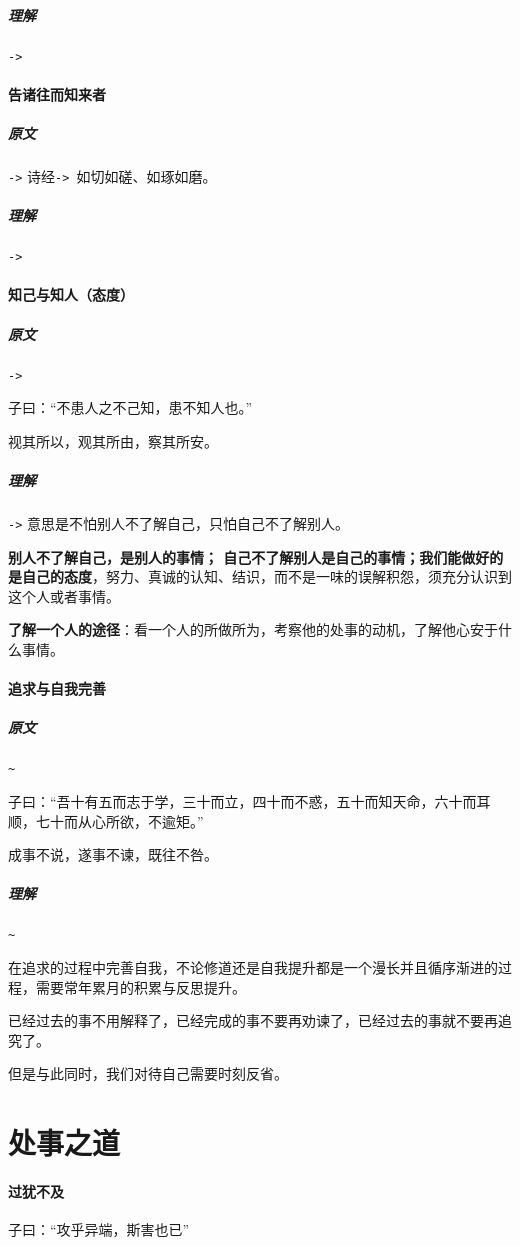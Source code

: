 \documentclass[UTF8,a4paper,8pt]{ctexbook}
\begin{document}
			\subparagraph{理解}\verb|->|
		
		\paragraph{告诸往而知来者}
			\subparagraph{原文}\verb|->|
				诗经\verb|-> |如切如磋、如琢如磨。
			
			\subparagraph{理解}\verb|->|
			
		\paragraph{知己与知人（态度）}
			\subparagraph{原文}\verb|->|
			
				子曰：“不患人之不己知，患不知人也。”
			
				视其所以，观其所由，察其所安。
			
			\subparagraph{理解}\verb|->|
				意思是不怕别人不了解自己，只怕自己不了解别人。
	
				\textbf{别人不了解自己，是别人的事情； 自己不了解别人是自己的事情；我们能做好的是自己的态度}，努力、真诚的认知、结识，而不是一味的误解积怨，须充分认识到这个人或者事情。
		
				\textbf{了解一个人的途径}：看一个人的所做所为，考察他的处事的动机，了解他心安于什么事情。
				
		\paragraph{追求与自我完善}
			\subparagraph{原文}\verb|~|
			
				子曰：“吾十有五而志于学，三十而立，四十而不惑，五十而知天命，六十而耳顺，七十而从心所欲，不逾矩。”
				
				成事不说，遂事不谏，既往不咎。
				
			\subparagraph{理解}\verb|~|
			
				在追求的过程中完善自我，不论修道还是自我提升都是一个漫长并且循序渐进的过程，需要常年累月的积累与反思提升。
				
				已经过去的事不用解释了，已经完成的事不要再劝谏了，已经过去的事就不要再追究了。
				
				但是与此同时，我们对待自己需要时刻反省。
				
	\section{处事之道}
		\paragraph{过犹不及}
				子曰：“攻乎异端，斯害也已”
				
\end{document}
